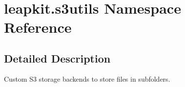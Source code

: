 \hypertarget{namespaceleapkit_1_1s3utils}{\section{leapkit.\-s3utils Namespace Reference}
\label{namespaceleapkit_1_1s3utils}
}


\subsection{Detailed Description}
\begin{DoxyVerb}Custom S3 storage backends to store files in subfolders.\end{DoxyVerb}
 